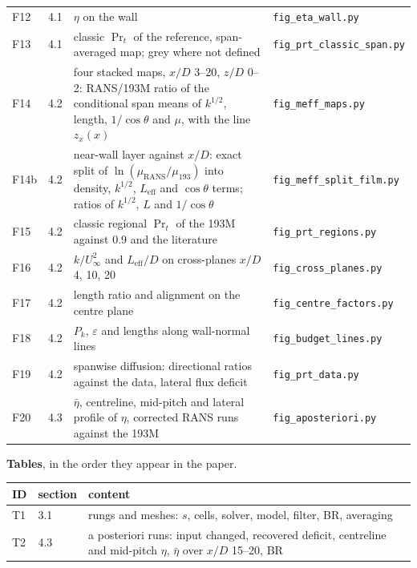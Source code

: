 \documentclass[10pt]{article}
\begin{document}
{\begin{tabularx}{\textwidth}{@{}l l X l@{}}
F12 & 4.1 & $\eta$ on the wall & \texttt{fig\_eta\_wall.py} \\
F13 & 4.1 & classic $\Pr_t$ of the reference, span-averaged map; grey where not defined & \texttt{fig\_prt\_classic\_span.py} \\
F14 & 4.2 & four stacked maps, $x/D$ 3--20, $z/D$ 0--2: RANS/193M ratio of the conditional span means of $k^{1/2}$, length, $1/\cos\theta$ and $\mu$, with the line $z_x(x)$ & \texttt{fig\_meff\_maps.py} \\
F14b & 4.2 & near-wall layer against $x/D$: exact split of $\ln(\mu_{\mathrm{RANS}}/\mu_{193})$ into density, $k^{1/2}$, $L_{\mathrm{eff}}$ and $\cos\theta$ terms; ratios of $k^{1/2}$, $L$ and $1/\cos\theta$ & \texttt{fig\_meff\_split\_film.py} \\
F15 & 4.2 & classic regional $\Pr_t$ of the 193M against 0.9 and the literature & \texttt{fig\_prt\_regions.py} \\
F16 & 4.2 & $k/U_\infty^2$ and $L_{\mathrm{eff}}/D$ on cross-planes $x/D$ 4, 10, 20 & \texttt{fig\_cross\_planes.py} \\
F17 & 4.2 & length ratio and alignment on the centre plane & \texttt{fig\_centre\_factors.py} \\
F18 & 4.2 & $P_k$, $\varepsilon$ and lengths along wall-normal lines & \texttt{fig\_budget\_lines.py} \\
F19 & 4.2 & spanwise diffusion: directional ratios against the data, lateral flux deficit & \texttt{fig\_prt\_data.py} \\
F20 & 4.3 & $\bar\eta$, centreline, mid-pitch and lateral profile of $\eta$, corrected RANS runs against the 193M & \texttt{fig\_aposteriori.py} \\
\bottomrule
\end{tabularx}\par}

\textbf{Tables}, in the order they appear in the paper.\par
{\centering\footnotesize
\begin{tabularx}{\textwidth}{@{}l l X@{}}
\toprule
ID & section & content \\
\midrule
T1 & 3.1 & rungs and meshes: $s$, cells, solver, model, filter, BR, averaging \\
T2 & 4.3 & a posteriori runs: input changed, recovered deficit, centreline and mid-pitch $\eta$, $\bar\eta$ over $x/D$ 15--20, BR \\
\bottomrule
\end{tabularx}\par}
\end{document}
